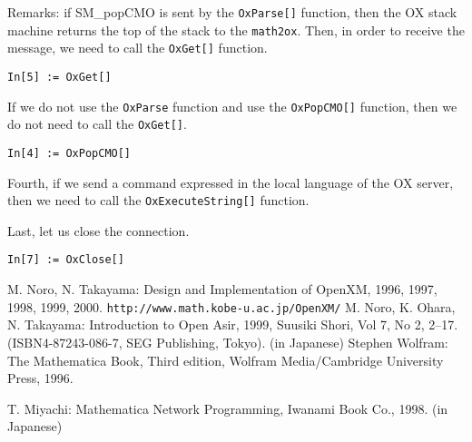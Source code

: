 \documentclass{article}
\begin{document}
Remarks: if SM\_popCMO is sent by the {\tt OxParse[]} function, then the
OX stack machine returns the top of the stack to the {\tt math2ox}.
Then, in order to receive the message, we need to call the {\tt OxGet[]}
function.
\begin{verbatim}
In[5] := OxGet[]
\end{verbatim}

If we do not use the {\tt OxParse} function and use the {\tt OxPopCMO[]}
function, then we do not need to call the {\tt OxGet[]}.
\begin{verbatim}
In[4] := OxPopCMO[]
\end{verbatim}

Fourth, if we send a command expressed in the local language of the OX
server, then we need to call the {\tt OxExecuteString[]} function.

Last, let us close the connection.
\begin{verbatim}
In[7] := OxClose[]
\end{verbatim}

\appendix

\begin{thebibliography}{99}
M. Noro, N. Takayama:
Design and Implementation of OpenXM, 1996, 1997, 1998, 1999, 2000.
{\footnotesize {\tt http://www.math.kobe-u.ac.jp/OpenXM/}}
M. Noro, K. Ohara, N. Takayama:
{Introduction to Open Asir}, 1999, Suusiki Shori, Vol 7, No 2,
2--17. (ISBN4-87243-086-7, SEG Publishing, Tokyo). (in Japanese)
Stephen Wolfram:
{The Mathematica Book}, Third edition,
Wolfram Media/Cambridge University Press, 1996.

T. Miyachi:
{Mathematica Network Programming},
Iwanami Book Co., 1998. (in Japanese)
\end{thebibliography}
\end{document}
